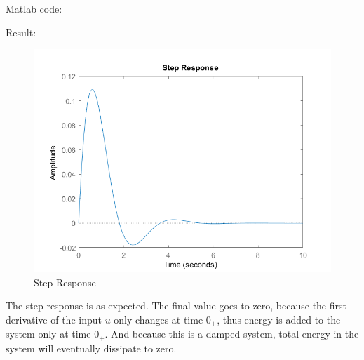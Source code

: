 Matlab code:
    
Result:
\begin{figure}[htp]
    \centering
    \includegraphics[width=12cm]{images/Q4_b_fig.png}
    \caption{Step Response}
    \label{fig:Q4b}
\end{figure}

The step response is as expected. The final value goes to zero, because the first derivative of the input $u$ only changes at time $0_{+}$, thus energy is added to the system only at time $0_{+}$. And because this is a damped system, total energy in the system will eventually dissipate to zero.
\pagebreak
